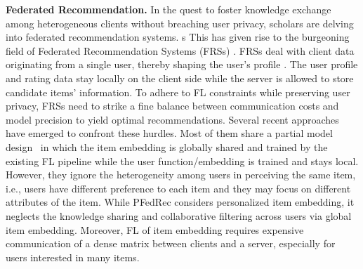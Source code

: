 \documentclass{article} %
\begin{document}
\textbf{Federated Recommendation.} In the quest to foster knowledge exchange among heterogeneous clients without breaching user privacy, scholars are delving into federated recommendation systems. s
This has given rise to the burgeoning field of Federated Recommendation Systems (FRSs) \citep{zhang2021survey}. FRSs deal with client data originating from a single user, thereby shaping the user's profile \citep{lin2020fedrec}. The user profile and rating data stay locally on the client side while the server is allowed to store candidate items' information. 
To adhere to FL constraints while preserving user privacy, FRSs need to strike a fine balance between communication costs and model precision to yield optimal recommendations. Several recent approaches \citep{lin2020fedrec,li2020federated,liang2021fedrec++,zhang2023lightfr} have emerged to confront these hurdles. Most of them share a partial model design~\citep{singhal2021federated,pillutla2022federated} in which the item embedding is globally shared and trained by the existing FL pipeline while the user function/embedding is trained and stays local. 
However, they ignore the heterogeneity among users in perceiving the same item, i.e., users have different preference to each item and they may focus on different attributes of the item. While PFedRec \citep{zhangdual} considers personalized item embedding, it neglects the knowledge sharing and collaborative filtering across users via global item embedding. Moreover, FL of item embedding requires expensive communication of a dense matrix between clients and a server, especially for users interested in many items. 
\end{document}
